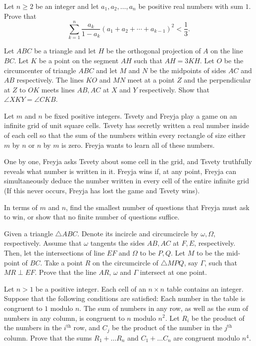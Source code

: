 \documentclass[11pt]{scrartcl}
\begin{document}
\begin{problem}[723258861624579]
Let $n\geq 2$ be an integer and let $a_1, a_2, \ldots, a_n$ be positive real numbers with sum $1$. Prove that$$\sum_{k=1}^n \frac{a_k}{1-a_k}(a_1+a_2+\cdots+a_{k-1})^2 < \frac{1}{3}.$$
\end{problem}
\begin{problem}[493493847475466779]
Let $ABC$ be a triangle and let $H$ be the orthogonal projection of $A$ on the line $BC$. Let $K$ be a point on the segment $AH$ such that $AH = 3 KH$. Let $O$ be the circumcenter of triangle $ABC$ and let $M$ and $N$ be the midpoints of sides $AC$ and $AB$ respectively. The lines $KO$ and $MN$ meet at a point $Z$ and the perpendicular at $Z$ to $OK$ meets lines $AB, AC$ at $X$ and $Y$ respectively. Show that $\angle XKY = \angle CKB$.
\end{problem}
\begin{problem}[496656338551810]
Let $m$ and $n$ be fixed positive integers. Tsvety and Freyja play a game on an infinite grid of unit square cells. Tsvety has secretly written a real number inside of each cell so that the sum of the numbers within every rectangle of size either $m$ by $n$ or $n$ by $m$ is zero. Freyja wants to learn all of these numbers.

One by one, Freyja asks Tsvety about some cell in the grid, and Tsvety truthfully reveals what number is written in it. Freyja wins if, at any point, Freyja can simultaneously deduce the number written in every cell of the entire infinite grid (If this never occurs, Freyja has lost the game and Tsvety wins).

In terms of $m$ and $n$, find the smallest number of questions that Freyja must ask to win, or show that no finite number of questions suffice.

\end{problem}
\begin{problem}[1965233157265405983]
Given a triangle $ \triangle{ABC} $. Denote its incircle and circumcircle by $ \omega, \Omega $, respectively. Assume that $ \omega $ tangents the sides $ AB, AC $ at $ F, E $, respectively. Then, let the intersections of line $ EF $ and $ \Omega $ to be $ P,Q $. Let $ M $ to be the mid-point of $ BC $. Take a point $ R $ on the circumcircle of $ \triangle{MPQ} $, say $ \Gamma $, such that $ MR \perp EF $. Prove that the line $ AR $, $ \omega $ and $ \Gamma $ intersect at one point.
\end{problem}
\begin{problem}[1248852037865425410]
Let $n>1$ be a positive integer. Each cell of an $n\times n$ table contains an integer. Suppose that the following conditions are satisfied:
Each number in the table is congruent to $1$ modulo $n$.
The sum of numbers in any row, as well as the sum of numbers in any column, is congruent to $n$ modulo $n^2$.
Let $R_i$ be the product of the numbers in the $i^{\text{th}}$ row, and $C_j$ be the product of the number in the $j^{\text{th}}$ column. Prove that the sums $R_1+\hdots R_n$ and $C_1+\hdots C_n$ are congruent modulo $n^4$.
\end{problem}
\end{document}
